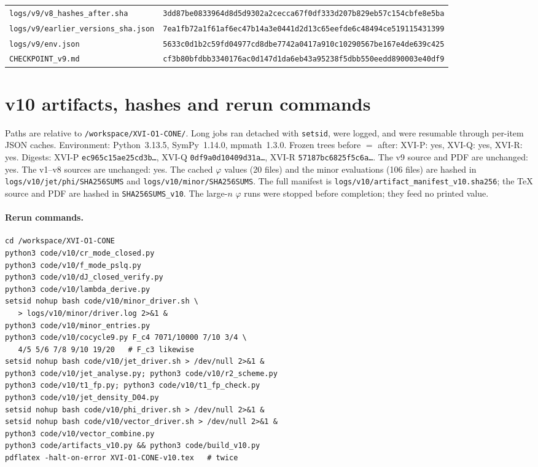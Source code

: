 \documentclass[11pt,a4paper]{article}
\newcommand{\loc}[1]{\nolinkurl{#1}}
\theoremstyle{plain}
\theoremstyle{definition}
\theoremstyle{remark}
\numberwithin{equation}{section}
\begin{document}
{\begin{longtable}{@{}p{.50\linewidth}p{.46\linewidth}@{}}
{\scriptsize\loc{logs/v9/v8_hashes_after.sha}} & \texttt{\tiny 3dd87be0833964d8d5d9302a2cecca67f0df333d207b829eb57c154cbfe8e5ba}\\
{\scriptsize\loc{logs/v9/earlier_versions_sha.json}} & \texttt{\tiny 7ea1fb72a1f61af6ec47b14a3e0441d2d13c65eefde6c48494ce519115431399}\\
{\scriptsize\loc{logs/v9/env.json}} & \texttt{\tiny 5633c0d1b2c59fd04977cd8dbe7742a0417a910c10290567be167e4de639c425}\\
{\scriptsize\loc{CHECKPOINT_v9.md}} & \texttt{\tiny cf3b80bfdbb3340176ac0d147d1da6eb43a95238f5dbb550eedd890003e40df9}\\
\end{longtable}}


\section{v10 artifacts, hashes and rerun commands}
\label{app:v10artifacts}

Paths are relative to \loc{/workspace/XVI-O1-CONE/}. Long jobs ran
detached with \loc{setsid}, were logged, and were resumable through
per-item JSON caches. Environment: Python~3.13.5, SymPy~1.14.0, mpmath~1.3.0.
Frozen trees before \(=\) after: XVI-P: yes, XVI-Q: yes, XVI-R: yes.
Digests: XVI-P \texttt{ec965c15ae25cd3b\ldots}, XVI-Q \texttt{0df9a0d10409d31a\ldots}, XVI-R \texttt{57187bc6825f5c6a\ldots}.
The v9 source and PDF are unchanged: yes. The v1--v8 sources are unchanged: yes.
The cached \(\varphi\) values (20 files) and the minor evaluations (106 files) are hashed in
\loc{logs/v10/jet/phi/SHA256SUMS} and \loc{logs/v10/minor/SHA256SUMS}. The full manifest is
\loc{logs/v10/artifact_manifest_v10.sha256}; the \TeX{} source and PDF are hashed in \loc{SHA256SUMS_v10}.
The large-\(n\) \(\varphi\) runs were stopped before completion; they feed no printed value.

\paragraph{Rerun commands.}
\begin{verbatim}
cd /workspace/XVI-O1-CONE
python3 code/v10/cr_mode_closed.py
python3 code/v10/f_mode_pslq.py
python3 code/v10/dJ_closed_verify.py
python3 code/v10/lambda_derive.py
setsid nohup bash code/v10/minor_driver.sh \
   > logs/v10/minor/driver.log 2>&1 &
python3 code/v10/minor_entries.py
python3 code/v10/cocycle9.py F_c4 7071/10000 7/10 3/4 \
   4/5 5/6 7/8 9/10 19/20   # F_c3 likewise
setsid nohup bash code/v10/jet_driver.sh > /dev/null 2>&1 &
python3 code/v10/jet_analyse.py; python3 code/v10/r2_scheme.py
python3 code/v10/t1_fp.py; python3 code/v10/t1_fp_check.py
python3 code/v10/jet_density_D04.py
setsid nohup bash code/v10/phi_driver.sh > /dev/null 2>&1 &
setsid nohup bash code/v10/vector_driver.sh > /dev/null 2>&1 &
python3 code/v10/vector_combine.py
python3 code/artifacts_v10.py && python3 code/build_v10.py
pdflatex -halt-on-error XVI-O1-CONE-v10.tex   # twice
\end{verbatim}
\end{document}
